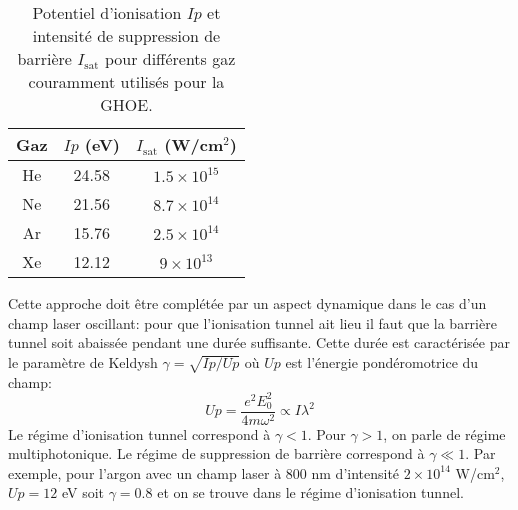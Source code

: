 \begin{table}
\begin{center}
\begin{tabular}{|c|c|c|}
\hline
Gaz & $Ip$ (eV) & $I_\text{sat}$ (W/cm$^2$) \\
\hline
He & 24.58 & $1.5 \times 10^{15}$ \\
\hline
Ne & 21.56 & $8.7 \times 10^{14}$ \\
\hline
Ar & 15.76 & $2.5 \times 10^{14}$ \\
\hline
Xe & 12.12 & $9 \times 10^{13}$ \\
\hline
\end{tabular}
\end{center}
\caption{Potentiel d'ionisation $Ip$ et intensité de suppression de barrière $I_\text{sat}$ pour différents gaz couramment utilisés pour la GHOE.}
\label{tab:Isat}
\end{table}

Cette approche doit être complétée par un aspect dynamique dans le cas d'un champ laser oscillant: pour que l'ionisation tunnel ait lieu il faut que la barrière tunnel soit abaissée pendant une durée suffisante. Cette durée est caractérisée par le paramètre de Keldysh  $\gamma = \sqrt{Ip/Up}$ où $Up$ est l'énergie pondéromotrice du champ:
\begin{equation}
Up = \frac{e^2 E_0^2}{4 m \omega^2} \propto I \lambda^2
\label{eq:Up}
\end{equation}
Le régime d'ionisation tunnel correspond à $\gamma < 1$. Pour $\gamma > 1$, on parle de régime multiphotonique. Le régime de suppression de barrière correspond à $\gamma \ll 1$. Par exemple, pour l'argon avec un champ laser à 800 nm d'intensité $2 \times 10^{14}$ W/cm$^2$, $Up = 12$ eV soit $\gamma = 0.8$ et on se trouve dans le régime d'ionisation tunnel.

